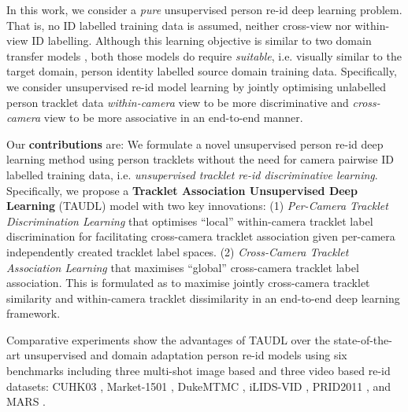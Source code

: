 \documentclass[runningheads]{llncs}
\begin{document}
In this work, we consider a {\em pure} unsupervised person re-id deep
learning problem. That is, no ID labelled training data is
assumed, neither cross-view 
nor within-view ID labelling.
Although this learning objective is similar to two domain
transfer models \cite{fan2017unsupervised,want2018Transfer}, both
those models do require {\em suitable}, i.e. visually similar to the
target domain, person identity labelled source domain training data.
Specifically, we consider unsupervised re-id model learning 
by jointly optimising unlabelled person tracklet data {\em
  within-camera} view to be more discriminative and {\em cross-camera}
view to be more associative in an end-to-end manner.


Our {\bf contributions} are:
We formulate a novel unsupervised person re-id deep learning method
using person tracklets without the need for
camera pairwise ID labelled training data,
i.e. {\em unsupervised tracklet re-id discriminative learning}.
Specifically, we propose a {\bf Tracklet Association Unsupervised
  Deep Learning} (TAUDL) model with two key innovations: (1) {\em
  Per-Camera Tracklet Discrimination Learning} that 
optimises ``local'' within-camera tracklet label discrimination for
facilitating cross-camera tracklet association given per-camera independently
created tracklet label spaces. 
(2) {\em
  Cross-Camera Tracklet Association Learning} that maximises
``global'' cross-camera tracklet label association. 
This is formulated as to maximise jointly
cross-camera tracklet similarity and
within-camera tracklet dissimilarity in an end-to-end deep learning framework.

Comparative experiments 
show the advantages of TAUDL over the state-of-the-art
unsupervised and domain adaptation person re-id models using six
benchmarks including three multi-shot image based and three video
based re-id datasets:
CUHK03 \cite{li2014deepreid}, 
Market-1501 \cite{zheng2015scalable}, 
DukeMTMC \cite{ristani2016MTMC}, 
iLIDS-VID \cite{wang2014person},
PRID2011 \cite{hirzer2011person},
and MARS \cite{zheng2016mars}.
\end{document}
